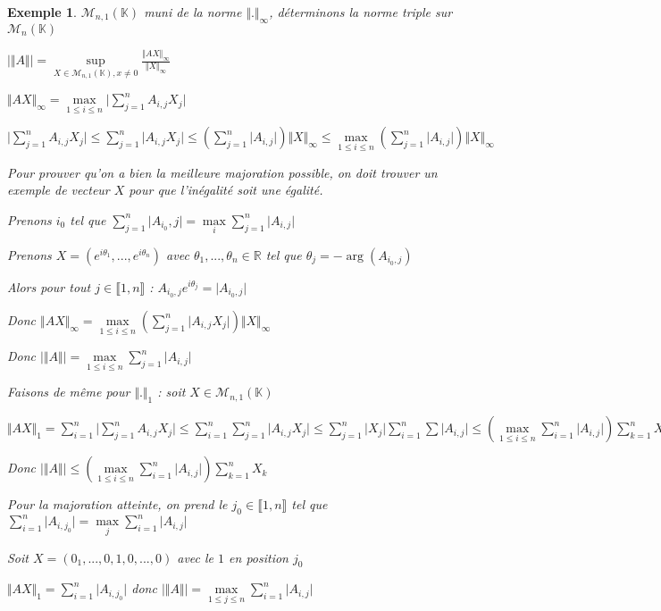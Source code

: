 \documentclass[a4paper,12pt]{book}
\newtheorem{Exe}{Exemple}[section]
\def\R{\mathbb{R}}
\def\K{\mathbb{K}}
\begin{document}
\begin{Exe}
$\mathcal{M}_{n,1}(\K)$ muni de la norme $\Vert.\Vert_\infty$, déterminons la norme triple sur $\mathcal{M}_n(\K)$ \par $\vert\Vert A\Vert\vert=\sup\limits_{X\in\mathcal{M}_{n,1}(\K), x\neq 0} \frac{\Vert AX\Vert_\infty}{\Vert X\Vert_\infty}$ \par $\Vert AX\Vert_\infty=\max\limits_{1\leq i\leq n}\vert\sum\limits_{j=1}^n A_{i,j}X_j\vert$ \par $\vert\sum\limits_{j=1}^n A_{i,j}X_j\vert\leq \sum\limits_{j=1}^n \vert A_{i,j}X_j\vert\leq\left(\sum\limits_{j=1}^n \vert A_{i,j}\vert\right)\Vert X\Vert_\infty\leq \max\limits_{1\leq i\leq n}\left(\sum\limits_{j=1}^n\vert A_{i,j}\vert\right) \Vert X\Vert_\infty$
\par Pour prouver qu'on a bien la meilleure majoration possible, on doit trouver un exemple de vecteur $X$ pour que l'inégalité soit une égalité. \par Prenons $i_0$ tel que $\sum\limits_{j=1}^n\vert A_{i_0}, j\vert=\max\limits_{i}\sum\limits_{j=1}^n\vert A_{i,j}\vert$ \par Prenons $X=(e^{i\theta_1},..., e^{i\theta_n})$ avec $\theta_1,...,\theta_n\in\R$ tel que $\theta_j=-\arg(A_{i_0,j})$ \par Alors pour tout $j\in\llbracket 1,n\rrbracket$ : $A_{i_0,j}e^{i\theta_j} = \vert A_{i_0,j}\vert$ \par Donc $\Vert AX\Vert_\infty=\max\limits_{1\leq i\leq n}\left(\sum\limits_{j=1}^n\vert A_{i,j}X_j\vert\right)\Vert X\Vert_\infty$
\par Donc $\vert\Vert A\Vert\vert = \max\limits_{1\leq i\leq n} \sum\limits_{j=1}^n\vert A_{i,j}\vert$
\par Faisons de même pour $\Vert.\Vert_1$ : soit $X\in\mathcal{M}_{n,1}(\K)$ \par $\Vert AX\Vert_1 = \sum\limits_{i=1}^n\vert\sum\limits_{j=1}^nA_{i,j}X_j\vert\leq \sum\limits_{i=1}^n\sum\limits_{j=1}^n\vert A_{i,j}X_j\vert\leq \sum\limits_{j=1}^n\vert X_j\vert \sum\limits_{i=1}^n\sum \vert A_{i,j}\vert \leq \left(\max\limits_{1\leq i\leq n} \sum\limits_{i=1}^n\vert A_{i,j}\vert\right)\sum\limits_{k=1}^n X_k$ \par Donc $\vert\Vert A\Vert\vert\leq\left(\max\limits_{1\leq i\leq n} \sum\limits_{i=1}^n\vert A_{i,j}\vert\right)\sum\limits_{k=1}^n X_k$
\par Pour la majoration atteinte, on prend le $j_0\in\llbracket 1,n\rrbracket$ tel que $\sum\limits_{i=1}^n\vert A_{i,j_0}\vert =\max\limits_{j}\sum\limits_{i=1}^n\vert A_{i,j}\vert$ \par Soit $X=(0_1,...,0, 1, 0,...,0)$ avec le $1$ en position $j_0$ \par $\Vert AX\Vert_1 = \sum\limits_{i=1}^n\vert A_{i,j_0}\vert$ donc $\vert\Vert A\Vert\vert =\max\limits_{1\leq j\leq n}\sum\limits_{i=1}^n\vert A_{i,j}\vert$ 
\end{Exe}
\end{document}
